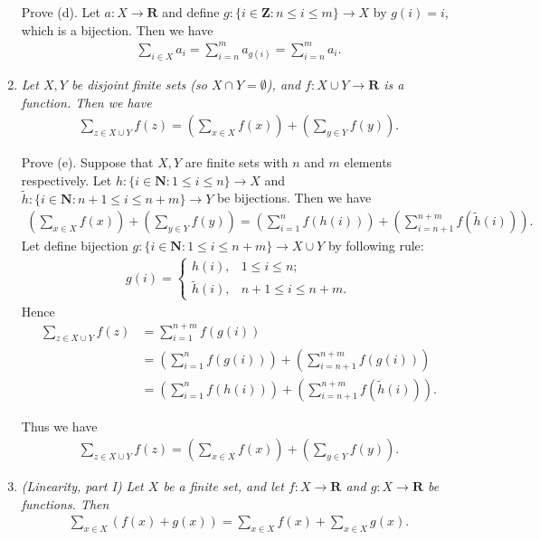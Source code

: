 \documentclass{book}
\begin{document}
\begin{enumerate}
    Prove (d). Let $a:X\to\mathbf{R}$ and define $g:\{i\in\mathbf{Z}:n\leq i\leq m\}\to X$ by $g(i)=i$, which is a bijection. Then we have
    \begin{align*}
        \sum_{i\in X}a_i=\sum_{i=n}^{m}a_{g(i)}=\sum_{i=n}^{m}a_i.
    \end{align*}

    \item \emph{Let $X, Y$ be disjoint finite sets (so $X\cap Y=\emptyset$), and $f:X\cup Y\to\mathbf{R}$ is a function. Then we have}
    \begin{align*}
        \sum_{z\in X\cup Y}f(z)=\left(\sum_{x\in X}f(x)\right)+\left(\sum_{y\in Y}f(y)\right).
    \end{align*}

    Prove (e). Suppose that $X,Y$ are finite sets with $n$ and $m$ elements respectively. Let $h:\{i\in\mathbf{N}:1\leq i\leq n\}\to X$ and $\widetilde h:\{i\in\mathbf{N}:n+1\leq i\leq n+m\}\to Y$ be bijections. Then we have
    \begin{align*}
        \left(\sum_{x\in X}f(x)\right)+\left(\sum_{y\in Y}f(y)\right)=\left(\sum_{i=1}^{n}f(h(i))\right)+\left(\sum_{i=n+1}^{n+m}f(\widetilde h(i))\right).
    \end{align*}
    Let define bijection $g:\{i\in\mathbf{N}:1\leq i\leq n+m\}\to X\cup Y$ by following rule:
    \begin{align*}
        g(i)=\left\{\begin{array}{ll}
            h(i),&1\leq i\leq n;\\
            \widetilde h(i),&n+1\leq i\leq n+m.
        \end{array}\right.
    \end{align*}
    Hence
    \begin{align*}
        \sum_{z\in X\cup Y}f(z)&=\sum_{i=1}^{n+m}f(g(i))\\
        &=\left(\sum_{i=1}^{n}f(g(i))\right)+\left(\sum_{i=n+1}^{n+m}f(g(i))\right)\\
        &=\left(\sum_{i=1}^{n}f(h(i))\right)+\left(\sum_{i=n+1}^{n+m}f(\widetilde h(i))\right).
    \end{align*}

    Thus we have
        \begin{align*}
            \sum_{z\in X\cup Y}f(z)=\left(\sum_{x\in X}f(x)\right)+\left(\sum_{y\in Y}f(y)\right).
        \end{align*}

    \item \emph{(Linearity, part I) Let $X$ be a finite set, and let $f:X\to\mathbf{R}$ and $g:X\to\mathbf{R}$ be functions. Then}
    \begin{align*}
        \sum_{x\in X}(f(x)+g(x))=\sum_{x\in X}f(x)+\sum_{x\in X}g(x).
    \end{align*}


\end{enumerate}
\end{document}
